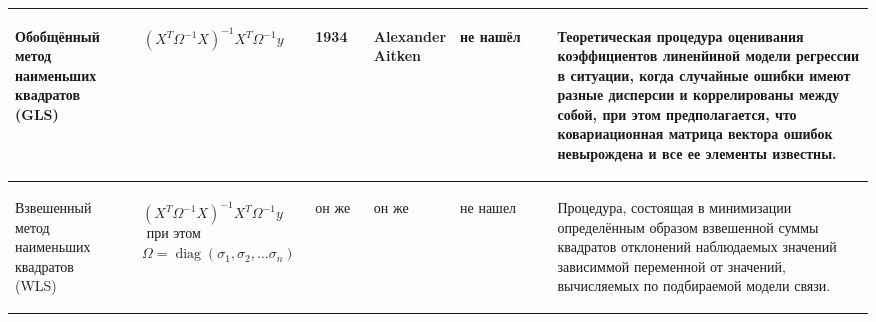 \documentclass[10pt,a4paper]{article}
\DeclareMathOperator{\diag}{diag}  %
\begin{document}
\begin{table}[h!]
\begin{center}
{\begin{tabular}{| p{0.13\linewidth} | p{0.18\linewidth}| p{0.07\linewidth} | p{0.1\linewidth} |p{0.12\linewidth} |p{0.4\linewidth} |}
\begin{center}Обобщённый метод наименьших квадратов \newline(GLS) \end{center} &\begin{center} \[(X^T \Omega^{-1} X)^{-1}X^T \Omega^{-1} y\]\end{center} & \begin{center}1934 \end{center}& \begin {center}Alexander Aitken \end{center} & \begin{center}не нашёл \end{center} & \begin{center}Теоретическая процедура оценивания коэффициентов линенйиной модели регрессии в ситуации, когда случайные ошибки имеют разные дисперсии и коррелированы между собой, при этом предполагается,  что ковариационная матрица вектора ошибок невырождена и все ее элементы известны. \end{center} \\
\hline
\begin{center}Взвешенный метод наименьших квадратов \newline (WLS) \end{center}& \begin{center} $\begin{aligned}  &(X^T \Omega^{-1} X)^{-1}  X^T \Omega^{-1} y \\ &\text{ при этом } \\ &\Omega = \diag(\sigma_1,\sigma_2, \ldots \sigma_n) 
\end{aligned}$\end{center}&\begin{center}  он же \end{center} & \begin{center}он же \end{center}& \begin{center}не нашел \end{center}  & \begin{center}Процедура, состоящая в минимизации определённым образом взвешенной суммы квадратов отклонений наблюдаемых значений зависиммой переменной от значений, вычисляемых по подбираемой модели связи. \end{center}\\
\hline

\end{tabular}}
\end{center}
\end{table}
\end{document}
